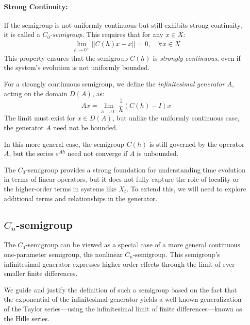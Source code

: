 \documentclass{article}
\begin{document}
\paragraph{Strong Continuity:}
If the semigroup is not uniformly continuous but still exhibits strong continuity, it is called a \textit{$C_0$-semigroup}. This requires that for any \( x \in X \):
\begin{align}
    \lim_{h \to 0^+} || C(h) x - x || = 0, \quad \forall x \in X \label{eq:strong_continuity}
\end{align}
This property ensures that the semigroup \( C(h) \) is \textit{strongly continuous}, even if the system's evolution is not uniformly bounded.

For a strongly continuous semigroup, we define the \textit{infinitesimal generator} \( A \), acting on the domain \( D(A) \), as:
\begin{equation}
    Ax =  \lim_{h\rightarrow0^+} \frac{1}{h} (C(h) - I)x \label{eq:continuity}
\end{equation}
The limit must exist for \( x \in D(A) \), but unlike the uniformly continuous case, the generator \( A \) need not be bounded.

In this more general case, the semigroup \( C(h) \) is still governed by the operator \( A \), but the series \( e^{Ah} \) need not converge if \( A \) is unbounded.

The $C_0$-semigroup provides a strong foundation for understanding time evolution in terms of linear operators, but it does not fully capture the role of locality or the higher-order terms in systems like \( X_t \). To extend this, we will need to explore additional terms and relationships in the generator.

\subsection{$C_n$-semigroup}

The $C_0$-semigroup can be viewed as a special case of a more general continuous one-parameter semigroup, the nonlinear $C_n$-semigroup. This semigroup's infinitesimal generator expresses higher-order effects through the limit of ever smaller finite differences.

We guide and justify the definition of such a semigroup based on the fact that the exponential of the infinitesimal generator yields a well-known generalization of the Taylor series—using the infinitesimal limit of finite differences—known as the Hille series.
\end{document}
